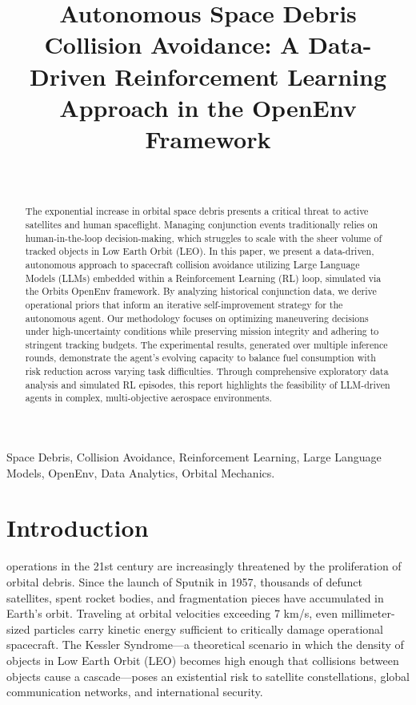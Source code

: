 \documentclass[10pt,journal,compsoc]{IEEEtran}
\begin{document}
\title{Autonomous Space Debris Collision Avoidance: A Data-Driven Reinforcement Learning Approach in the OpenEnv Framework}

\author{
    \\
}

\maketitle

\begin{abstract}
The exponential increase in orbital space debris presents a critical threat to active satellites and human spaceflight. Managing conjunction events traditionally relies on human-in-the-loop decision-making, which struggles to scale with the sheer volume of tracked objects in Low Earth Orbit (LEO). In this paper, we present a data-driven, autonomous approach to spacecraft collision avoidance utilizing Large Language Models (LLMs) embedded within a Reinforcement Learning (RL) loop, simulated via the Orbits OpenEnv framework. By analyzing historical conjunction data, we derive operational priors that inform an iterative self-improvement strategy for the autonomous agent. Our methodology focuses on optimizing maneuvering decisions under high-uncertainty conditions while preserving mission integrity and adhering to stringent tracking budgets. The experimental results, generated over multiple inference rounds, demonstrate the agent's evolving capacity to balance fuel consumption with risk reduction across varying task difficulties. Through comprehensive exploratory data analysis and simulated RL episodes, this report highlights the feasibility of LLM-driven agents in complex, multi-objective aerospace environments.
\end{abstract}

\begin{IEEEkeywords}
Space Debris, Collision Avoidance, Reinforcement Learning, Large Language Models, OpenEnv, Data Analytics, Orbital Mechanics.
\end{IEEEkeywords}

\section{Introduction}
 operations in the 21st century are increasingly threatened by the proliferation of orbital debris. Since the launch of Sputnik in 1957, thousands of defunct satellites, spent rocket bodies, and fragmentation pieces have accumulated in Earth's orbit. Traveling at orbital velocities exceeding 7 km/s, even millimeter-sized particles carry kinetic energy sufficient to critically damage operational spacecraft. The Kessler Syndrome—a theoretical scenario in which the density of objects in Low Earth Orbit (LEO) becomes high enough that collisions between objects cause a cascade—poses an existential risk to satellite constellations, global communication networks, and international security.
\end{document}
